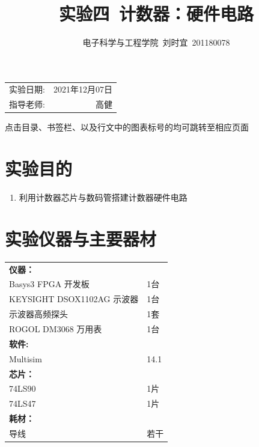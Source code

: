 \documentclass[UTF8]{ctexart}
\title{\textbf{实验四\ 计数器：硬件电路}} %
\author{电子科学与工程学院\ 刘时宜\ 201180078} %
\date{} %
\numberwithin{figure}{subsection}
\numberwithin{table}{subsection}
\numberwithin{equation}{subsection}
\begin{document}
\pagestyle{EE_Digital1Exp_template}

\maketitle %

\begin{center}
    \begin{tabular}{l r}
    实验日期: & 2021年12月07日 \\ %
    指导老师: & 高健 %
    \end{tabular}
    \par 点击目录、书签栏、以及行文中的图表标号的均可跳转至相应页面
    \end{center}
    

\tableofcontents

\section{实验目的}
\begin{enumerate}
    \item 利用计数器芯片与数码管搭建计数器硬件电路
\end{enumerate}

\section{实验仪器与主要器材}
\begin{center}
    \begin{tabular}{ll}
        \textbf{仪器：} & \\
        Basys3 FPGA 开发板 & 1台\\
        KEYSIGHT DSOX1102AG 示波器 & 1台\\
        示波器高频探头 & 1套\\
        ROGOL DM3068 万用表 & 1台\\
        \textbf{软件:} & \\
        Multisim & 14.1 \\
        \textbf{芯片：} & \\
        74LS90 & 1片 \\
        74LS47 & 1片 \\
        \textbf{耗材：} & \\
        导线 & 若干 \\
    \end{tabular}
\end{center}
\end{document}
